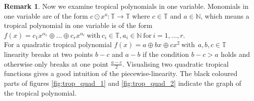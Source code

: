 \documentclass{article}
\theoremstyle{definition}
\newtheorem{remark}[theorem]{Remark}
\begin{document}
\begin{remark}
Now we examine tropical polynomials in one variable. Monomials in one variable are of the form $ c \odot x^{a}: \mathbb{T} \to \mathbb{T}$ where $c \in \mathbb{T}$ and $ a \in \mathbb{N} $, which means a tropical polynomial in one variable is of the form $f(x)=c_1x^{\alpha_1} \oplus \dots \oplus c_rx^{\alpha_r} \ \text{with} \ c_i \in \mathbb{T}, a_i \in \mathbb{N} \ \text{for} \ i=1, \dots , r$. \\
For a quadratic tropical polynomial $f(x) = a \oplus bx \oplus cx^{2} \ \text{with} \ \ a,b,c \in \mathbb{T}$ linearity breaks at two points $b-c$ and $a-b$ if the condition $b-c > a$ holds and otherwise only breaks at one point $\frac{a-c}{2}$. Visualising two quadratic tropical functions gives a good intuition of the piecewise-linearity. The black coloured parts of figures \ref{fig:trop_quad_1} and \ref{fig:trop_quad_2} indicate the graph of the tropical polynomial.

\begin{figure}[h]


\end{figure}
\end{remark}
\end{document}
